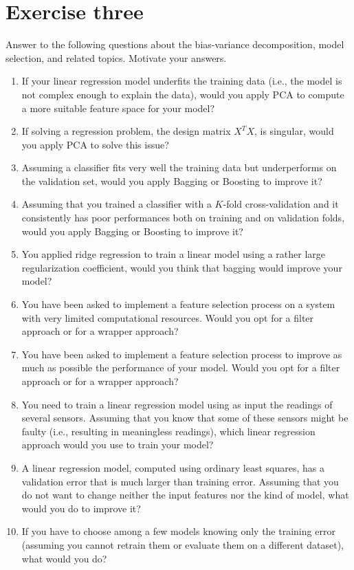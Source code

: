 \section{Exercise three}

Answer to the following questions about the bias-variance decomposition, model selection, and related topics. 
Motivate your answers.
\begin{enumerate}
    \item If your linear regression model underfits the training data (i.e., the model is not complex enough to explain the data), would you apply PCA to compute a more suitable feature space for your model?
    \item If solving a regression problem, the design matrix $X^TX$, is singular, would you apply PCA to solve this issue?
    \item Assuming a classifier fits very well the training data but underperforms on the validation set, would you apply Bagging or Boosting to improve it?
    \item Assuming that you trained a classifier with a $K$-fold cross-validation and it consistently has poor performances both on training and on validation folds, would you apply Bagging or Boosting to improve it?
    \item You applied ridge regression to train a linear model using a rather large regularization coefficient, would you think that bagging would improve your model?
    \item You have been asked to implement a feature selection process on a system with very limited computational resources. Would you opt for a filter approach or for a wrapper approach?
    \item You have been asked to implement a feature selection process to improve as much as possible the performance of your model. Would you opt for a filter approach or for a wrapper approach?
    \item You need to train a linear regression model using as input the readings of several sensors. 
        Assuming that you know that some of these sensors might be faulty (i.e., resulting in meaningless readings), which linear regression approach would you use to train your model?
    \item A linear regression model, computed using ordinary least squares, has a validation error that is much larger than training error. 
        Assuming that you do not want to change neither the input features nor the kind of model, what would you do to improve it?
    \item If you have to choose among a few models knowing only the training error (assuming you cannot retrain them or evaluate them on a different dataset), what would you do?
\end{enumerate}


